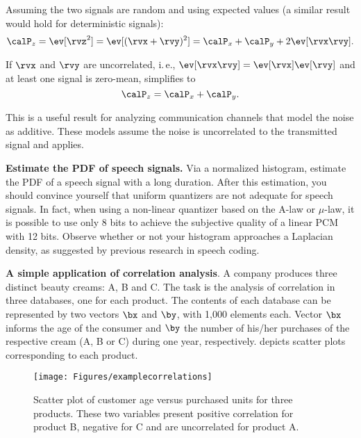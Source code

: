 Assuming the two signals are random and using expected values (a similar result would hold for deterministic signals):
\begin{equation}
\calP_z = \ev[\rvz^2] = \ev[(\rvx+\rvy)^2] = \calP_x + \calP_y + 2 \ev[\rvx \rvy].
\label{eq:power_of_sum_correlated}
\end{equation}

If $\rvx$ and $\rvy$ are uncorrelated, i.\,e., $\ev[\rvx \rvy]=\ev[\rvx]\ev[\rvy]$ and at least one signal is zero-mean,  simplifies to
\begin{equation}
\calP_z = \calP_x + \calP_y.
\label{eq:power_of_sum_uncorrelated}
\end{equation}

This is a useful result for analyzing communication channels that model the noise as additive.
These models assume the noise is uncorrelated to the transmitted signal and  applies.
\eApplication

\bApplication \textbf{Estimate the PDF of speech signals.} Via a normalized histogram, estimate the PDF of a speech signal with a long duration. After this estimation, you should convince yourself that uniform quantizers are not adequate for speech signals. In fact, when using a non-linear quantizer based on the A-law or $\mu$-law, it is possible to use only 8 bits to achieve the subjective quality of a linear PCM with 12 bits.
Observe whether or not your histogram approaches a Laplacian density, as suggested by previous research in speech coding.
\eApplication

\bApplication \textbf{A simple application of correlation analysis}.
\label{app:correlationBeautyCream}
A company produces three distinct beauty creams: A, B and C. The task is the analysis of correlation in three  databases, one for each product. The contents of each database can be represented by two vectors $\bx$ and $\by$, with 1,000 elements each.  Vector $\bx$ informs the age of the consumer and $\by$ the number of his/her purchases of the respective cream (A, B or C) during one year, respectively.  depicts scatter plots corresponding to each product.

\begin{figure}
	\centering
		\texttt{[image: Figures/examplecorrelations]}		
	\caption[Scatter plot of customer age versus purchased units for three products.]{Scatter plot of customer age versus purchased units for three products. These two variables present positive correlation for product B, negative for C and are uncorrelated for product A.\label{fig:examplecorrelations}}
\end{figure}


